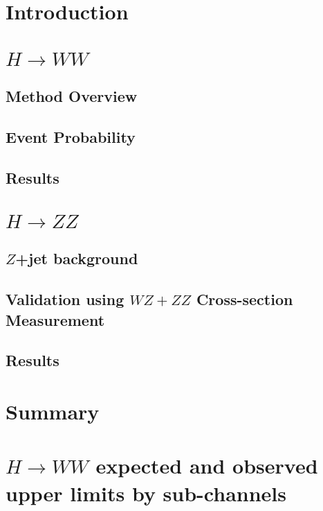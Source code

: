 \documentclass{cmspaper}
\begin{document}
\section{Introduction}
\label{sec:Intro}



\section{$H \rightarrow WW$ }

\subsection{Method Overview}
\label{sec:Meth_Overview}
\label{hwwintro}

\subsection{Event Probability}
\label{sec:Evt_Prob}



\subsection{Results}
\label{results_hww}


\clearpage

\section{$H \rightarrow ZZ$ }
\label{sec:hzzintro}


\subsection{$Z$+jet background}
\label{sec:hzzbkg_zjets}


\subsection{Validation using $WZ+ZZ$ Cross-section Measurement}
\label{sec:vzvalidation}



\subsection{Results}
\label{sec:results_hzz}

\clearpage


\section{Summary}
\label{sec:summary}


\clearpage

\appendix


 \section{$H\to WW$ expected and observed upper limits by sub-channels}
     \label{app:hwwsubchannels}
     



 
\end{document}
